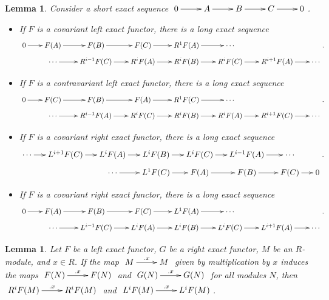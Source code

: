 \documentclass[11pt]{book}
\newtheorem{lemma}[theorem]{Lemma}
\numberwithin{equation}{section}
\numberwithin{theorem}{chapter}
\theoremstyle{definition}
\newtheorem*{basic properties}{Basic Properties}
\newtheorem*{Important Remark}{Important Remark}
\theoremstyle{remark}
\begin{document}
\begin{lemma}\label{long exact sequence}
	Consider a short exact sequence $\xymatrix{0 \ar[r] & A \ar[r] & B \ar[r] & C \ar[r] & 0}$.
	\begin{itemize}
		\item If $F$ is a covariant left exact functor, there is a long exact sequence
	$$\xymatrix@R=2mm@C=7mm{0 \ar[r] & F(A) \ar[r] & F(B) \ar[r] & F(C) \ar[r] & R^1F(A) \ar[r] & \cdots \\
		&\cdots \ar[r] & R^{i-1}F(C) \ar[r] & R^iF(A) \ar[r] & R^iF(B) \ar[r] & R^iF(C) \ar[r] & R^{i+1}F(A) \ar[r] & \cdots}.$$
		
	
		\item If $F$ is a contravariant left exact functor, there is a long exact sequence
		$$\xymatrix@R=2mm@C=7mm{0 \ar[r] & F(C) \ar[r] & F(B) \ar[r] & F(A) \ar[r] & R^1F(C) \ar[r] & \cdots \\
		&\cdots \ar[r] & R^{i-1}F(A) \ar[r] & R^iF(C) \ar[r] & R^iF(B) \ar[r] & R^iF(A) \ar[r] & R^{i+1}F(C) \ar[r] & \cdots}.$$
		
		
		\item If $F$ is a covariant right exact functor, there is a long exact sequence
		$$\xymatrix@R=2mm@C=5mm{\cdots \ar[r] & L^{i+1}F(C) \ar[r] & L^iF(A) \ar[r] & L^iF(B) \ar[r] & L^iF(C) \ar[r] & L^{i-1}F(A) \ar[r] & \cdots \\
		&& \cdots \ar[r] & L^1F(C) \ar[r] & F(A) \ar[r] & F(B) \ar[r] & F(C) \ar[r] & 0}.$$
		
		\item If $F$ is a covariant right exact functor, there is a long exact sequence
		$$\xymatrix@R=2mm@C=7mm{0 \ar[r] & F(A) \ar[r] & F(B) \ar[r] & F(C) \ar[r] & L^1F(A) \ar[r] & \cdots \\
		&\cdots \ar[r] & L^{i-1}F(C) \ar[r] & L^iF(A) \ar[r] & L^iF(B) \ar[r] & L^iF(C) \ar[r] & L^{i+1}F(A) \ar[r] & \cdots}.$$
	\end{itemize}
\end{lemma}


\begin{lemma}
	Let $F$ be a left exact functor, $G$ be a right exact functor, $M$ be an $R$-module, and ${x \in R}$. If the map $\xymatrix{M \ar[r]^-{.x} & M}$ given by multiplication by $x$ induces the maps $\xymatrix{F(N)\ar[r]^-{.x}& F(N)}$ and $\xymatrix{G(N) \ar[r]^-{.x} & G(N)}$ for all modules $N$, then $\xymatrix{R^iF(M) \ar[r]^-{.x} & R^i F(M)}$ and $\xymatrix{L^iF(M) \ar[r]^-{.x} & L^iF(M)}$.
\end{lemma}
\end{document}
